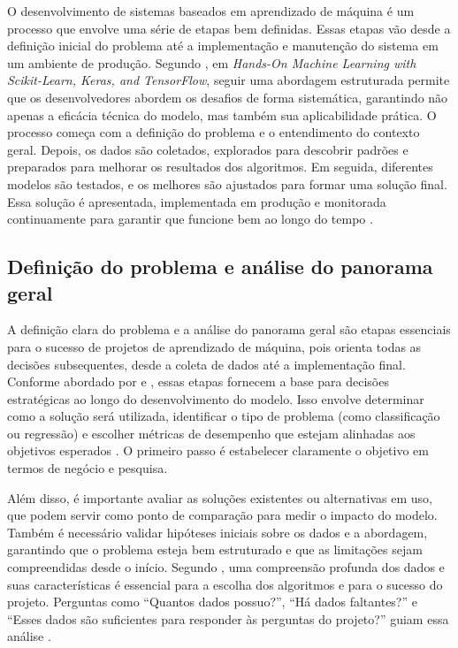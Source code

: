O desenvolvimento de sistemas baseados em aprendizado de máquina é um processo que envolve uma série de etapas bem definidas. Essas etapas vão desde a definição inicial do problema até a implementação e manutenção do sistema em um ambiente de produção. Segundo , em \textit{Hands-On Machine Learning with Scikit-Learn, Keras, and TensorFlow}, seguir uma abordagem estruturada permite que os desenvolvedores abordem os desafios de forma sistemática, garantindo não apenas a eficácia técnica do modelo, mas também sua aplicabilidade prática. O processo começa com a definição do problema e o entendimento do contexto geral. Depois, os dados são coletados, explorados para descobrir padrões e preparados para melhorar os resultados dos algoritmos. Em seguida, diferentes modelos são testados, e os melhores são ajustados para formar uma solução final. Essa solução é apresentada, implementada em produção e monitorada continuamente para garantir que funcione bem ao longo do tempo \cite{geron2017}.

\subsection{Definição do problema e análise do panorama geral}
A definição clara do problema e a análise do panorama geral são etapas essenciais para o sucesso de projetos de aprendizado de máquina, pois orienta todas as decisões subsequentes, desde a coleta de dados até a implementação final. Conforme abordado por  e , essas etapas fornecem a base para decisões estratégicas ao longo do desenvolvimento do modelo.  Isso envolve determinar como a solução será utilizada, identificar o tipo de problema (como classificação ou regressão) e escolher métricas de desempenho que estejam alinhadas aos objetivos esperados \cite{geron2017}. O primeiro passo é estabelecer claramente o objetivo em termos de negócio e pesquisa. 

Além disso, é importante avaliar as soluções existentes ou alternativas em uso, que podem servir como ponto de comparação para medir o impacto do modelo. Também é necessário validar hipóteses iniciais sobre os dados e a abordagem, garantindo que o problema esteja bem estruturado e que as limitações sejam compreendidas desde o início. Segundo , uma compreensão profunda dos dados e suas características é essencial para a escolha dos algoritmos e para o sucesso do projeto. Perguntas como “Quantos dados possuo?”, “Há dados faltantes?” e “Esses dados são suficientes para responder às perguntas do projeto?” guiam essa análise \cite{muller2017}.

